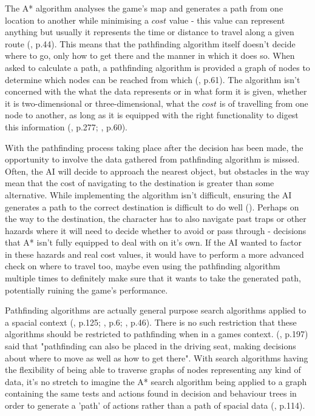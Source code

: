 \documentclass[11pt, a4paper]{article}
\begin{document}
The A* algorithm analyses the game's map and generates a path from one location to another while minimising a $cost$ value - this value can represent anything but usually it represents the time or distance to travel along a given route (\cite{yap2002grid}, p.44). This means that the pathfinding algorithm itself doesn't decide where to go, only how to get there and the manner in which it does so. When asked to calculate a path, a pathfinding algorithm is provided a graph of nodes to determine which nodes can be reached from which (\cite{nareyek2004ai}, p.61). The algorithm isn't concerned with the what the data represents or in what form it is given, whether it is two-dimensional or three-dimensional, what the $cost$ is of travelling from one node to another, as long as it is equipped with the right functionality to digest this information (\cite{millington2019ai}, p.277; \cite{graham2003pathfinding}, p.60).

With the pathfinding process taking place after the decision has been made, the opportunity to involve the data gathered from pathfinding algorithm is missed. Often, the AI will decide to approach the nearest object, but obstacles in the way mean that the cost of navigating to the destination is greater than some alternative. While implementing the algorithm isn't difficult, ensuring the AI generates a path to the correct destination is difficult to do well (\cite{forbus2002qualitative}). Perhaps on the way to the destination, the character has to also navigate past traps or other hazards where it will need to decide whether to avoid or pass through - decisions that A* isn't fully equipped to deal with on it's own. If the AI wanted to factor in these hazards and real cost values, it would have to perform a more advanced check on where to travel too, maybe even using the pathfinding algorithm multiple times to definitely make sure that it wants to take the generated path, potentially ruining the game's performance.

Pathfinding algorithms are actually general purpose search algorithms applied to a spacial context (\cite{cui2011based}, p.125; \cite{orkin2003applying}, p.6; \cite{yap2002grid}, p.46). There is no such restriction that these algorithms should be restricted to pathfinding when in a games context. \citeauthor{millington2019ai} (\citeyear{millington2019ai}, p.197) said that "pathfinding can also be placed in the driving seat, making decisions about where to move as well as how to get there". With search algorithms having the flexibility of being able to traverse graphs of nodes representing any kind of data, it's no stretch to imagine the A* search algorithm being applied to a graph containing the same tests and actions found in decision and behaviour trees in order to generate a 'path' of actions rather than a path of spacial data (\cite{higgins2002generic}, p.114).
\end{document}
